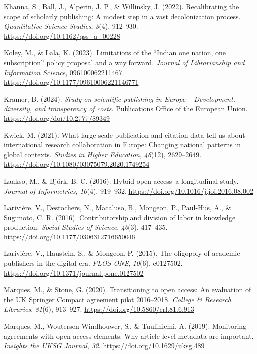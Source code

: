 \documentclass[a4paper,man,floatsintext,longtable,noextraspace,12pt]{apa6}
\newlength{\cslhangindent}
\newenvironment{CSLReferences}[2] %
  {\begin{list}{}{%
   \setlength{\itemindent}{0pt}
   \setlength{\leftmargin}{0pt}
   \setlength{\parsep}{0pt}
   \ifodd #1
    \setlength{\leftmargin}{\cslhangindent}
    \setlength{\itemindent}{-1\cslhangindent}
   \fi
   \setlength{\itemsep}{#2\baselineskip}}}
  {\end{list}}
\begin{document}
\begin{CSLReferences}{1}{0}
Khanna, S., Ball, J., Alperin, J. P., \& Willinsky, J. (2022).
Recalibrating the scope of scholarly publishing: A modest step in a vast
decolonization process. \emph{Quantitative Science Studies},
\emph{3}(4), 912--930. \url{https://doi.org/10.1162/qss_a_00228}

Koley, M., \& Lala, K. (2023). Limitations of the {{``Indian one nation,
one subscription''}} policy proposal and a way forward. \emph{Journal of
Librarianship and Information Science}, 096100062211467.
\url{https://doi.org/10.1177/09610006221146771}

Kramer, B. (2024). \emph{Study on scientific publishing in {Europe} --
{Development}, diversity, and transparency of costs}. Publications
Office of the European Union. \url{https://doi.org/doi/10.2777/89349}

Kwiek, M. (2021). What large-scale publication and citation data tell us
about international research collaboration in {Europe}: Changing
national patterns in global contexts. \emph{Studies in Higher
Education}, \emph{46}(12), 2629--2649.
\url{https://doi.org/10.1080/03075079.2020.1749254}

Laakso, M., \& Björk, B.-C. (2016). Hybrid open access--a longitudinal
study. \emph{Journal of Informetrics}, \emph{10}(4), 919--932.
\url{https://doi.org/10.1016/j.joi.2016.08.002}

Larivière, V., Desrochers, N., Macaluso, B., Mongeon, P., Paul-Hus, A.,
\& Sugimoto, C. R. (2016). Contributorship and division of labor in
knowledge production. \emph{Social Studies of Science}, \emph{46}(3),
417--435. \url{https://doi.org/10.1177/0306312716650046}

Larivière, V., Haustein, S., \& Mongeon, P. (2015). The oligopoly of
academic publishers in the digital era. \emph{{PLOS} {ONE}},
\emph{10}(6), e0127502.
\url{https://doi.org/10.1371/journal.pone.0127502}

Marques, M., \& Stone, G. (2020). Transitioning to open access: An
evaluation of the {UK} {Springer Compact} agreement pilot 2016--2018.
\emph{College {\&} Research Libraries}, \emph{81}(6), 913--927.
\url{https://doi.org/10.5860/crl.81.6.913}

Marques, M., Woutersen-Windhouwer, S., \& Tuuliniemi, A. (2019).
Monitoring agreements with open access elements: Why article-level
metadata are important. \emph{Insights the {UKSG} Journal}, \emph{32}.
\url{https://doi.org/10.1629/uksg.489}


\end{CSLReferences}
\end{document}
